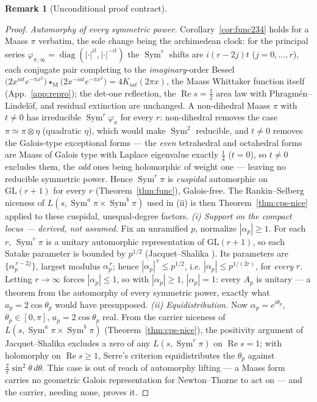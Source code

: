 \documentclass[11pt]{article}
\theoremstyle{definition}
\newtheorem{remark}[theorem]{Remark}
\renewcommand{\Re}{\operatorname{Re}}
\newcommand{\Sym}{\operatorname{Sym}}
\begin{document}
\begin{remark}[Unconditional proof contract]
\begin{enumerate}
\begin{proof}
\emph{Automorphy of every symmetric power.} Corollary~\ref{cor:func234} holds for a Maass $\pi$ verbatim, the
sole change being the archimedean clock: for the principal series
$\varphi_{\pi,\infty}=\operatorname{diag}(|\cdot|^{it},|\cdot|^{-it})$ the $\Sym^r$ shifts are $i(r-2j)t$
($j=0,\dots,r$), each conjugate pair completing to the \emph{imaginary}-order Bessel
$\big(2x^{iat}e^{-\pi x^2}\big)\star_{\mathrm M}\big(2x^{-iat}e^{-\pi x^2}\big)=4K_{iat}(2\pi x)$, the Maass
Whittaker function itself (App.~\ref{app:repro}); the det-one reflection, the $\Re s=\tfrac12$ area law with
Phragm\'en--Lindel\"of, and residual extinction are unchanged. A non-dihedral Maass $\pi$ with $t\neq0$ has
irreducible $\Sym^r\varphi_\pi$ for every $r$: non-dihedral removes the case $\pi\simeq\pi\otimes\eta$ (quadratic
$\eta$), which would make $\Sym^2$ reducible, and $t\neq0$ removes the Galois-type exceptional forms --- the
\emph{even} tetrahedral and octahedral forms are Maass of Galois type with Laplace eigenvalue exactly $\tfrac14$
($t=0$), so $t\neq0$ excludes them, the \emph{odd} ones being holomorphic of weight one --- leaving no reducible
symmetric power. Hence $\Sym^r\pi$ is \emph{cuspidal} automorphic on $\mathrm{GL}(r+1)$ for
every $r$ (Theorem~\ref{thm:func}), Galois-free. The Rankin--Selberg niceness of $L(s,\Sym^a\pi\times\Sym^b\pi)$
used in (ii) is then Theorem~\ref{thm:cps-nice} applied to these cuspidal, unequal-degree factors.
\emph{(i) Support on the compact locus --- derived, not assumed.} Fix an unramified $p$, normalize
$|\alpha_p|\ge1$. For each $r$, $\Sym^r\pi$ is a unitary automorphic representation of $\mathrm{GL}(r+1)$, so
each Satake parameter is bounded by $p^{1/2}$ (Jacquet--Shalika \cite{JS}). Its parameters are
$\{\alpha_p^{\,r-2j}\}$, largest modulus $\alpha_p^{\,r}$; hence $|\alpha_p|^{\,r}\le p^{1/2}$, i.e.
$|\alpha_p|\le p^{1/(2r)}$, for \emph{every} $r$. Letting $r\to\infty$ forces $|\alpha_p|\le1$, so with
$|\alpha_p|\ge1$, $|\alpha_p|=1$: every $A_p$ is unitary --- a theorem from the automorphy of every symmetric
power, exactly what $a_p=2\cos\theta_p$ would have presupposed.
\emph{(ii) Equidistribution.} Now $\alpha_p=e^{i\theta_p}$, $\theta_p\in[0,\pi]$, $a_p=2\cos\theta_p$ real.
From the carrier niceness of $L(s,\Sym^a\pi\times\Sym^b\pi)$ (Theorem~\ref{thm:cps-nice}), the positivity
argument of Jacquet--Shalika \cite{JS} excludes a zero of any $L(s,\Sym^r\pi)$ on $\Re s=1$; with holomorphy
on $\Re s\ge1$, Serre's criterion \cite{Serre} equidistributes the $\theta_p$ against
$\tfrac2\pi\sin^2\theta\,d\theta$. This case is out of reach of automorphy lifting --- a Maass form carries no
geometric Galois representation for Newton--Thorne \cite{NT} to act on --- and the carrier, needing none,
proves it.
\end{proof}


\end{enumerate}
\end{remark}
\end{document}
